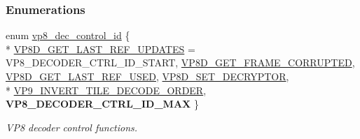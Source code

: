 \subsubsection*{Enumerations}
\begin{DoxyCompactItemize}
\item 
enum \hyperlink{group__vp8__decoder_gaf9dd3f2e6d1412106ee791af768e57c1}{vp8\+\_\+dec\+\_\+control\+\_\+id} \{ \\*
\hyperlink{group__vp8__decoder_ggaf9dd3f2e6d1412106ee791af768e57c1a0b6055c47120f28e3de959960ee0a02b}{V\+P8\+D\+\_\+\+G\+E\+T\+\_\+\+L\+A\+S\+T\+\_\+\+R\+E\+F\+\_\+\+U\+P\+D\+A\+T\+E\+S} = V\+P8\+\_\+\+D\+E\+C\+O\+D\+E\+R\+\_\+\+C\+T\+R\+L\+\_\+\+I\+D\+\_\+\+S\+T\+A\+R\+T, 
\hyperlink{group__vp8__decoder_ggaf9dd3f2e6d1412106ee791af768e57c1af9f82d9e7930e6a2244b30b031b79599}{V\+P8\+D\+\_\+\+G\+E\+T\+\_\+\+F\+R\+A\+M\+E\+\_\+\+C\+O\+R\+R\+U\+P\+T\+E\+D}, 
\hyperlink{group__vp8__decoder_ggaf9dd3f2e6d1412106ee791af768e57c1aa57d870ac8cf395fdc86da4a8939b10b}{V\+P8\+D\+\_\+\+G\+E\+T\+\_\+\+L\+A\+S\+T\+\_\+\+R\+E\+F\+\_\+\+U\+S\+E\+D}, 
\hyperlink{group__vp8__decoder_ggaf9dd3f2e6d1412106ee791af768e57c1a19729525ca07f7299638f0fd0c9fe320}{V\+P8\+D\+\_\+\+S\+E\+T\+\_\+\+D\+E\+C\+R\+Y\+P\+T\+O\+R}, 
\\*
\hyperlink{group__vp8__decoder_ggaf9dd3f2e6d1412106ee791af768e57c1a1c4fc468749a2ef88e148f09210ce73c}{V\+P9\+\_\+\+I\+N\+V\+E\+R\+T\+\_\+\+T\+I\+L\+E\+\_\+\+D\+E\+C\+O\+D\+E\+\_\+\+O\+R\+D\+E\+R}, 
{\bfseries V\+P8\+\_\+\+D\+E\+C\+O\+D\+E\+R\+\_\+\+C\+T\+R\+L\+\_\+\+I\+D\+\_\+\+M\+A\+X}
 \}
\begin{DoxyCompactList}\small\item\em V\+P8 decoder control functions. \end{DoxyCompactList}\end{DoxyCompactItemize}
